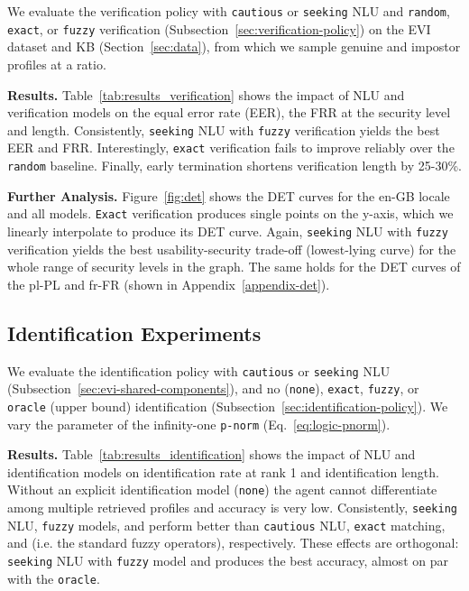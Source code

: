 \documentclass[11pt]{article}
\newcommand{\rparagraph}[1]{\vspace{1.4mm}\noindent\textbf{#1.}}
\begin{document}
{ 
We evaluate the verification policy
with \texttt{cautious} or \texttt{seeking} NLU
and \texttt{random}, \texttt{exact}, or \texttt{fuzzy}
verification (Subsection~\ref{sec:verification-policy})
on the EVI dataset and KB (Section~\ref{sec:data}),
from which we sample genuine and impostor profiles
at a  ratio.


\rparagraph{Results}
Table~\ref{tab:results_verification} shows
the impact of NLU and verification models
on the equal error rate (EER), the FRR at the  security level and length.
Consistently,
\texttt{seeking} NLU with \texttt{fuzzy} verification
yields the best EER and FRR.
Interestingly,
\texttt{exact} verification
fails to improve reliably
over the \texttt{random} baseline.
Finally, early termination shortens verification length by 25-30\%.

\rparagraph{Further Analysis} Figure~\ref{fig:det}
shows the DET curves for the en-GB locale and all models.
\texttt{Exact} verification produces single points on the y-axis,
which we linearly interpolate to produce its DET curve.
Again,
\texttt{seeking} NLU with \texttt{fuzzy} verification
yields the best usability-security trade-off (lowest-lying curve)
for the whole range of security levels in the graph.
The same holds for the DET curves of the pl-PL and fr-FR
(shown in Appendix~\ref{appendix-det}).







\subsection{Identification Experiments}
\label{sec:identification-experiments}


We evaluate the identification policy
with \texttt{cautious} or \texttt{seeking} NLU (Subsection~\ref{sec:evi-shared-components}),
and no (\texttt{none}), \texttt{exact}, \texttt{fuzzy}, or \texttt{oracle} (upper bound) identification (Subsection~\ref{sec:identification-policy}).
We vary the  parameter
of the infinity-one \texttt{p-norm} (Eq.~\ref{eq:logic-pnorm}).


\rparagraph{Results} Table~\ref{tab:results_identification}
shows the impact of NLU and identification models on identification rate at rank 1 and identification length.
Without an explicit identification model (\texttt{none})
the agent cannot differentiate among multiple retrieved profiles
and accuracy is very low.
Consistently,
\texttt{seeking} NLU,
\texttt{fuzzy} models,
and  
perform better than
\texttt{cautious} NLU,
\texttt{exact} matching,
and  (i.e. the standard fuzzy operators), respectively.
These effects are orthogonal:
\texttt{seeking} NLU with \texttt{fuzzy} model and 
produces the best accuracy,
almost on par with the \texttt{oracle}.


}
\end{document}
